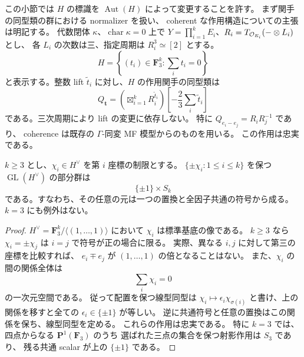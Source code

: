 この小節では $H$ の標識を $\operatorname{Aut}(H)$ によって変更することを許す。
まず関手の同型類の群における normalizer を扱い、
coherent な作用構造についての主張は明記する。
代数閉体 $\kappa$、$\operatorname{char}\kappa=0$ 上で
$Y=\prod_{i=1}^kE_i$、$R_i=T_{\mathcal O_{E_i}}(-\otimes L_i)$ とし、
各 $L_i$ の次数は三、指定周期は $R_i^3\simeq[2]$ とする。
\[
 H=\left\{(t_i)\in\mathbf F_3^k:\sum_i t_i=0\right\}
\]
と表示する。整数 lift $\widetilde t_i$ に対し、$H$ の作用関手の同型類は
\begin{equation}\label{mbfc:eq:normalizer-action}
 Q_{\mathbf t}=
 \left(\mathop{\boxtimes}_{i=1}^k R_i^{\widetilde t_i}\right)
 \left[-\frac{2}{3}\sum_i\widetilde t_i\right]
\end{equation}
である。三次周期により lift の変更に依存しない。
特に $Q_{e_i-e_j}=R_iR_j^{-1}$ であり、
coherence は既存の $\Gamma$-同変 MF 模型からのものを用いる。
この作用は忠実である。

\begin{lemma}[三因子以上の指標配置]
\label{mbfc:lem:normalizer-characters}
$k\ge3$ とし、$\chi_i\in H^\vee$ を第 $i$ 座標の制限とする。
$\{\pm\chi_i:1\le i\le k\}$ を保つ $\operatorname{GL}(H^\vee)$ の部分群は
\[
 \{\pm1\}\times S_k
\]
である。すなわち、その任意の元は一つの置換と全因子共通の符号から成る。
$k=3$ にも例外はない。
\end{lemma}
\begin{proof}
$H^\vee=\mathbf F_3^k/\langle(1,\ldots,1)\rangle$ において
$\chi_i$ は標準基底の像である。
$k\ge3$ なら $\chi_i=\pm\chi_j$ は $i=j$ で符号が正の場合に限る。
実際、異なる $i,j$ に対して第三の座標を比較すれば、
$e_i\mp e_j$ が $(1,\ldots,1)$ の倍となることはない。
また、$\chi_i$ の間の関係全体は
\[
 \sum_i\chi_i=0
\]
の一次元空間である。
従って配置を保つ線型同型は $\chi_i\mapsto\epsilon_i\chi_{\sigma(i)}$
と書け、上の関係を移すと全ての $\epsilon_i\in\{\pm1\}$ が等しい。
逆に共通符号と任意の置換はこの関係を保ち、線型同型を定める。
これらの作用は忠実である。
特に $k=3$ では、四点からなる $\mathbf P^1(\mathbf F_3)$ のうち
選ばれた三点の集合を保つ射影作用は $S_3$ であり、
残る共通 scalar が上の $\{\pm1\}$ である。
\end{proof}


